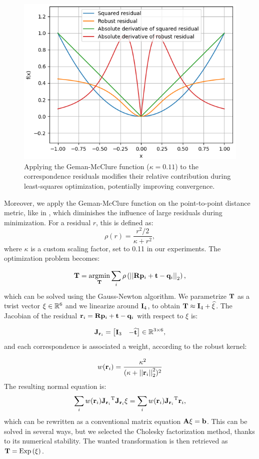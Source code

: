 \begin{figure}
	\centering
	\includegraphics[width=0.5\linewidth]{images/robust-fn.png}
	\caption[Robust residual function]{Applying the Geman-McClure function ($\kappa=0.11$) to the correspondence residuals modifies their relative contribution during least-squares optimization, potentially improving convergence.}
	\label{fig:robust-residual}
\end{figure}
\newcommand{\residuali}{\vecx{r}_{i}}
\newcommand{\residualjac}{\matx{J}_{\residuali}}
Moreover, we apply the Geman-McClure function  on the point-to-point distance metric, like in \cite{vizzo2023ral}, which diminishes the influence of large residuals during minimization. For a residual $r$, this is defined as:
\begin{equation}
	\rho(r) = \frac{r^2/2}{\kappa + r^2}
	\comma
\end{equation}
where $\kappa$ is a custom scaling factor, set to 0.11 in our experiments. The optimization problem becomes:

\begin{equation}
	\mathbf{T} = \underset{\mathbf{T}}{\text{argmin}} \sum_{i}
	\rho \left(\left|\left|{\mathbf{R}\mathbf{p}_i + \mathbf{t} - \mathbf{q}_i}\right|\right|_2 \right)
	\text{,}
\end{equation}
which can be solved using the Gauss-Newton algorithm. We parametrize $\mathbf{T}$ as a twist vector $\xi \in {\mathbb{R}}^6 $ and we linearize around $\mathbf{I}_4$, to obtain $\mathbf{T} \approx \mathbf{I}_4 + \widehat{\xi}$. The Jacobian of the residual $\residuali =\distpqi$ with respect to $\xi$ is:

\begin{equation}
	\residualjac = \begin{bmatrix}
		\matx{I}_3 & -\widehat{\vecx{t}}
	\end{bmatrix} \in \RR^{3\times6}
	\comma
\end{equation}
and each correspondence is associated a weight, according to the robust kernel:

\begin{equation}
	w(\residuali)=\frac{\kappa^2}{(\kappa + \normtwo{\residuali}^2)^2}
\end{equation}
The resulting normal equation is:
\begin{equation}
	\sum_{i} w(\residuali)\transpose{\residualjac}\residualjac\xi =
	\sum_{i} w(\residuali)\transpose{\residualjac}\residuali
	\comma
\end{equation}
which can be rewritten as a conventional matrix equation $	\mathbf{A}\xi = \mathbf{b}$. This can be solved in several ways, but we selected the Cholesky factorization method, thanks to its numerical stability. The wanted transformation is then retrieved as $\mathbf{T} = \text{Exp}\left({\xi}\right)$.


